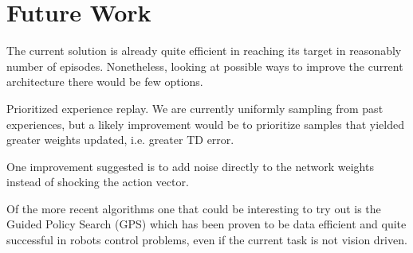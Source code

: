 \documentclass[pagenumber=off]{article}
\begin{document}


\section{Future Work}

The current solution is already quite efficient in reaching its target in reasonably number of episodes.
Nonetheless, looking at possible ways to improve the current architecture there would be few options.

Prioritized experience replay. We are currently uniformly sampling from past experiences, but a likely improvement would be to prioritize samples that yielded greater weights updated, i.e. greater TD error.

One improvement suggested is to add noise directly to the network weights instead of shocking the action vector.

Of the more recent algorithms one that could be interesting to try out is the Guided Policy Search (GPS) which has been proven to be data efficient and quite successful in robots control problems, even if the current task is not vision driven. 
\end{document}
